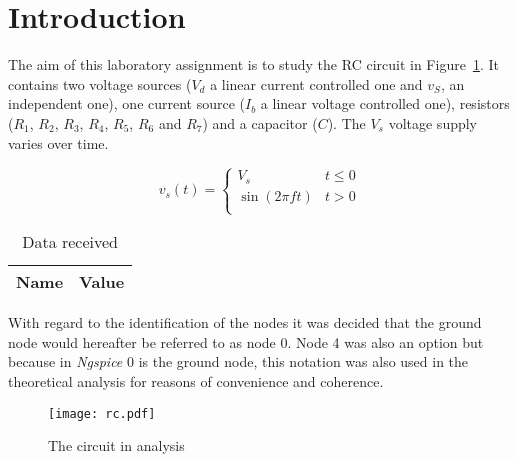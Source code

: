 \section{Introduction}
\label{sec:introduction}


The aim of this laboratory assignment is to study the RC circuit in Figure~\ref{fig:rc}. It contains two voltage sources ($V_d$ a linear current controlled one and $v_S$, an independent one), one current source ($I_b$ a linear voltage controlled one), resistors ($R_1$, $R_2$, $R_3$, $R_4$, $R_5$, $R_6$ and $R_7$) and a capacitor ($C$).
The $V_s$ voltage supply varies over time.

\[ 
v_s (t)= \left\{
\begin{array}{ll}
      V_s & t \leq 0 \\
      \sin(2 \pi f t) & t>0\\
\end{array} 
\right. 
\]

\begin{table}[hbt!]
  \centering
  \begin{tabular}{|c|c|}
    \hline    
    {\bf Name} & {\bf Value} \\ \hline
    
  \end{tabular}
  \caption{Data received}
  \label{tab:data}
\end{table}



With regard to the identification of the nodes it was decided that the ground node would hereafter be referred to as node 0. Node 4 was also an option but because in \textit{Ngspice} 0 is the ground node, this notation was also used in the theoretical analysis for reasons of convenience and coherence.


\begin{figure}[h] \centering
\texttt{[image: rc.pdf]}
\caption{The circuit in analysis}
\label{fig:rc}
\end{figure}




%    



